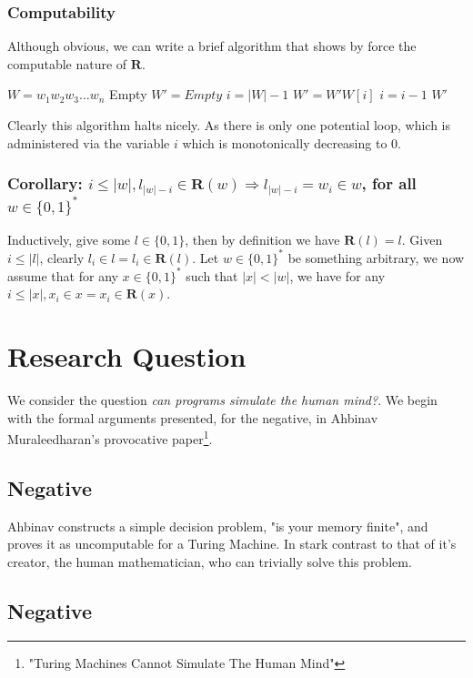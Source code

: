 \documentclass{article}
\begin{document}
\subsubsection*{Computability}
Although obvious, we can write a brief algorithm that shows by force the computable nature of $\bm{R}$.

\begin{algorithmic}[1]
	\REQUIRE $W = w_1w_2w_3...w_n$
			\RETURN Empty 
	\ENDIF
	\STATE $W' = Empty$
	\STATE $i = |W| - 1$
		\STATE $W' = W'W[i]$
		\STATE $i = i - 1$
	\ENDWHILE
	\RETURN $W'$ 
\end{algorithmic}

Clearly this algorithm halts nicely. As there is only one potential loop, which is administered via the variable $i$ which is monotonically decreasing to 0.

\subsubsection*{Corollary: $i \leq |w|, l_{|w| - i} \in \bm{R}(w) \Rightarrow l_{|w| - i}=w_i \in w$, for all $w \in \{0,1\}^*$}
Inductively, give some $l \in \{0,1\}$, then by definition we have $\bm{R}(l) = l$. Given $i \leq |l|$, clearly $l_i \in l = l_i \in \bm{R}(l)$. Let $w \in \{0,1\}^*$ be something arbitrary, we now assume that for any $x \in \{0,1\}^*$ such that $|x| < |w|$, we have for any $i \leq |x|, x_i \in x = x_i \in \bm{R}(x)$.

\section*{Research Question}
We consider the question \emph{can programs simulate the human mind?}. We begin with the formal arguments presented, for the negative, in Ahbinav Muraleedharan's provocative paper\footnote{"Turing Machines Cannot Simulate The Human Mind"}.

\subsection*{Negative}
Ahbinav constructs a simple decision problem, "is your memory finite", and proves it as uncomputable for a Turing Machine. In stark contrast to that of it's creator, the human mathematician, who can trivially solve this problem.

\subsection*{Negative}
\end{document}
